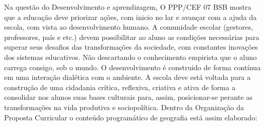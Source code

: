 \indent Na questão do Desenvolvimento e aprendizagem, O PPP/CEF 07 BSB mostra que a educação deve priorizar ações, com inicio no lar e avançar com a ajuda da escola, com vista ao desenvolvimento humano. A comunidade escolar (gestores, professores, país e etc.) devem possibilitar ao aluno as condições necessárias para superar seus desafios das transformações da sociedade, com constantes inovações dos sistemas educativos. Não descartando o conhecimento empirista que o aluno carrega consigo, sob o mundo. O desenvolvimento é construido de forma contínua em uma interação dialética com o ambiente. A escola deve está voltada para a construção de uma cidadania crítica, reflexiva, criativa e ativa de forma a consolidar nos alunos suas bases culturais para, assim, posicionar-se perante as transformações na vida produtiva e sociopolítica. Dentro da Organização da Proposta Curricular o conteúdo programático de geografia está assim elaborado:\\

